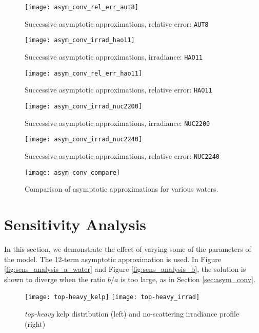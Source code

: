 \begin{figure}[H]
  \centering
  \texttt{[image: asym\_conv\_rel\_err\_aut8]}
  \caption{Successive asymptotic approximations, relative error: \texttt{AUT8}}
\end{figure}


\begin{figure}[H]
  \centering
  \texttt{[image: asym\_conv\_irrad\_hao11]}
  \caption{Successive asymptotic approximations, irradiance: \texttt{HAO11}}
\end{figure}

\begin{figure}[H]
  \centering
  \texttt{[image: asym\_conv\_rel\_err\_hao11]}
  \caption{Successive asymptotic approximations, relative error: \texttt{HAO11}}
\end{figure}


\begin{figure}[H]
  \centering
  \texttt{[image: asym\_conv\_irrad\_nuc2200]}
  \caption{Successive asymptotic approximations, irradiance: \texttt{NUC2200}}
\end{figure}

\begin{figure}[H]
  \centering
  \texttt{[image: asym\_conv\_irrad\_nuc2240]}
  \caption{Successive asymptotic approximations, relative error: \texttt{NUC2240}}
\end{figure}


\begin{figure}[H]
  \centering
  \texttt{[image: asym\_conv\_compare]}
  \caption{Comparison of asymptotic approximations for various waters.}
  \label{fig:asym_conv_compare}
\end{figure}

\section{Sensitivity Analysis}
In this section, we demonstrate the effect of varying some of the parameters of the model.
The 12-term asymptotic approximation is used.
In Figure \ref{fig:sens_analysis_a_water} and Figure \ref{fig:sens_analysis_b}, the solution
is shown to diverge when the ratio $b/a$ is too large, as in Section \ref{sec:asym_conv}.

\begin{figure}[H]
  \centering
  \vspace{-3em}
  \texttt{[image: top-heavy\_kelp]}
  \texttt{[image: top-heavy\_irrad]}
  \caption{\textit{top-heavy} kelp distribution (left) and no-scattering irradiance profile (right)}
\end{figure}


